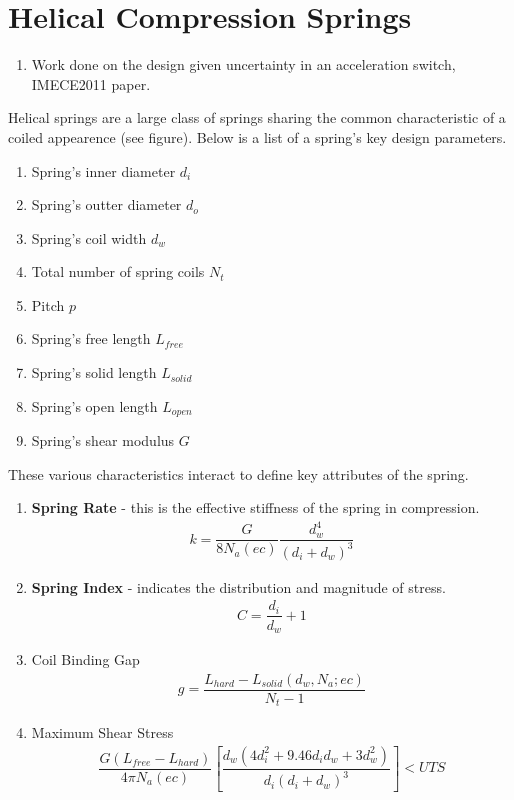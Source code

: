 \documentclass[11pt]{article}
\begin{document}
	\section{Helical Compression Springs}
	
	\begin{enumerate}
		
		\item Work done on the design given uncertainty in an acceleration switch, IMECE2011 paper.
		
	\end{enumerate}
		

Helical springs are a large class of springs sharing the common characteristic of a coiled appearence (see figure).  Below is a list of a spring's key design parameters.

		\begin{enumerate}
			\item Spring's inner diameter $d_{i}$ 
			\item Spring's outter diameter $d_{o}$
			\item Spring's coil width $d_{w}$
			\item Total number of spring coils $N_{t}$
			\item Pitch $p$
			\item Spring's free length $L_{free}$
			\item Spring's solid length $L_{solid}$
			\item Spring's open length $L_{open}$
			\item Spring's shear modulus $G$
		\end{enumerate}

These various characteristics interact to define key attributes of the spring.

	\begin{enumerate}
		\item \textbf{Spring Rate} - this is the effective stiffness of the spring in compression.
\begin{align*}
		k = \dfrac{G}{8 N_{a} (ec)} \dfrac{d_{w}^{4}}{(d_{i}+d_{w})^{3}}
\end{align*}
		\item \textbf{Spring Index} - indicates the distribution and magnitude of stress.
\begin{align*}
		C = \dfrac{d_{i}}{d_{w}} + 1
\end{align*}
		\item Coil Binding Gap
\begin{align*}
	g = \dfrac{L_{hard} - L_{solid}(d_{w},N_{a}; ec)}{N_{t} - 1}
\end{align*}
		\item Maximum Shear Stress
\begin{align*}
		\dfrac{G(L_{free} - L_{hard})}{4 \pi N_{a} (ec)} [\dfrac{d_{w} (4d_{i}^{2} + 9.46d_{i} 
d_{w} + 3 d_{w}^{2})}{d_{i}(d_{i}+d_{w})^{3}}] < UTS
\end{align*}
	\end{enumerate}
\end{document}
